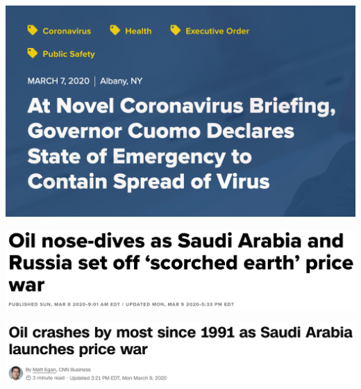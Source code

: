 \documentclass[9pt]{beamer}
\theoremstyle{definition}
\begin{document}
\begin{frame}

    \begin{example}
        \href{https://www.governor.ny.gov/news/novel-coronavirus-briefing-governor-cuomo-declares-state-emergency-contain-spread-virus}{\includegraphics[scale=.3]{NYS_state.png}}

        \href{https://www.cnbc.com/2020/03/08/opec-deal-collapse-sparks-price-war-20-oil-in-2020-is-coming.html}{\includegraphics[scale=.3]{cnn.png}}

        \href{https://www.cnn.com/2020/03/08/investing/oil-prices-crash-opec-russia-saudi-arabia/index.html}{\includegraphics[scale=.3]{cnbc.png}}
        \end{example}

\end{frame}
    
\end{document}
